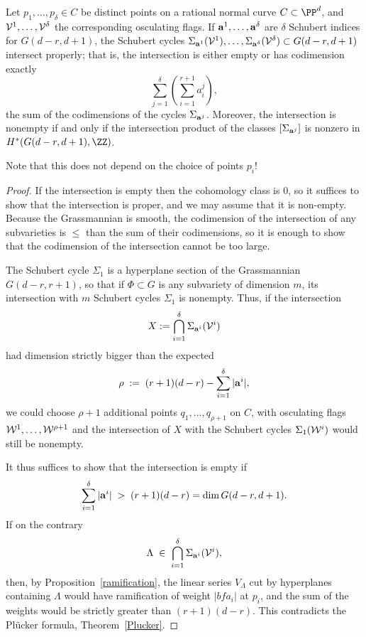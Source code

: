 \begin{theorem}\label{osculating intersection}
Let $p_1,\dots,p_\delta \in C$ be distinct points on a rational normal curve $C \subset \PP^d$, and ${\cal V}^1, \dots, {\cal V}^\delta$ the corresponding osculating flags. If ${\bf a}^1, \dots, {\bf a}^\delta$ are $\delta$ Schubert indices for $G(d-r, d+1)$, the Schubert cycles $\Sigma_{{\bf a}^1}({\cal V}^1), \dots, \Sigma_{{\bf a}^\delta}({\cal V}^\delta) \subset G(d-r, d+1)$ intersect properly; that is, the intersection is either empty or has codimension exactly
$$
\sum_{j=1}^\delta\left(\sum_{i = 1}^{r+1}a^j_i\right),
$$
 the sum of the codimensions of the cycles $\Sigma_{{\bf a}^j}$. Moreover, the intersection is nonempty if and only if
 the intersection product of the classes $[\Sigma_{{\bf a}^j}]$ is nonzero in $H^*(G(d-r, d+1), \ZZ)$.
\end{theorem}

Note that this does not depend on the choice of points $p_i$!

\begin{proof} 
If the intersection is empty then the cohomology class is 0, so it suffices to show that the intersection is proper,
and we may assume that it is non-empty. Because the Grassmannian is smooth, the codimension of the intersection of any subvarieties
 is $\leq$ than the sum of their codimensions, so it is enough to show that the codimension of the
 intersection cannot be too large.

The Schubert cycle $\Sigma_1$ is a hyperplane section of the Grassmannian $G(d-r, r+1)$, so that if $\Phi \subset G$ is any subvariety of dimension $m$, its intersection with $m$ Schubert cycles $\Sigma_1$ is nonempty. Thus, if the intersection
$$
X := \bigcap_{i=1}^\delta \Sigma_{{\bf a}^i}({\cal V}^i)
$$
had dimension strictly bigger than the expected
$$
\rho \; := \; (r+1)(d-r) - \sum_{i=1}^\delta |{\bf a}^i|,
$$
we could choose $\rho + 1$ additional points $q_1,\dots,q_{\rho + 1}$ on $C$, with osculating flags ${\cal W}^1, \dots, {\cal W}^{\rho + 1}$ and the intersection of $X$ with the Schubert cycles $\Sigma_1({\cal W}^i)$ would still be nonempty.

It thus suffices to show that the intersection is empty if
$$
\sum_{i=1}^\delta |{\bf a}^i| \; > \; (r+1)(d-r) = \dim G(d-r, d+1).
$$
If on the contrary 
$$
\Lambda \; \in \; \bigcap_{i=1}^\delta \Sigma_{{\bf a}^i}({\cal V}^i),
$$
then, by Proposition~\ref{ramification}, the linear series $V_\Lambda$ cut by hyperplanes containing $\Lambda$ would have
ramification of weight $|{bf a_i}|$ at $p_i$, and the sum of the weights would be strictly greater than $(r+1)(d-r)$. 
This contradicts the Pl\"ucker formula, Theorem~\ref{Plucker}.
\end{proof}


